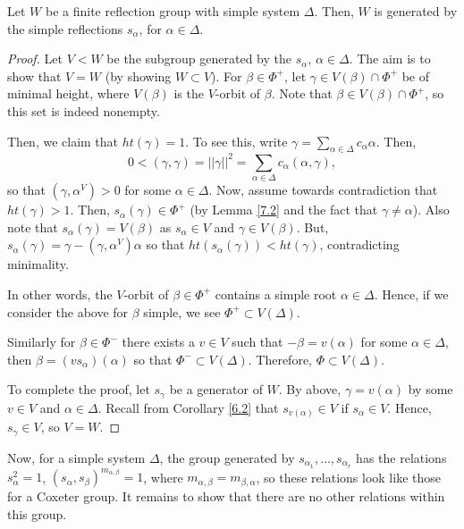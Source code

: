 \begin{theorem} \label{8.2}
Let $W$ be a finite reflection group with simple system $\Delta$. Then, $W$ is
generated by the simple reflections $s_\alpha$, for $\alpha \in \Delta$.
\end{theorem}

\begin{proof}
Let $V < W$ be the subgroup generated by the $s_\alpha$, $\alpha \in \Delta$.
The aim is to show that $V = W$ (by showing $W \subset V$).
For $\beta \in \Phi^+$, let $\gamma \in V(\beta) \cap \Phi^+$ be of minimal
height, where $V(\beta)$ is the $V$-orbit of $\beta$. Note that $\beta \in V(\beta)
\cap \Phi^+$, so this set is indeed nonempty.

Then, we claim that $ht(\gamma) = 1$. To see this, write
$\gamma = \sum_{\alpha \in \Delta} c_\alpha \alpha$. Then,
\[
    0 < (\gamma, \gamma) = ||\gamma||^2 = \sum_{\alpha \in \Delta}
    c_\alpha (\alpha, \gamma),
\]
so that $(\gamma, \alpha^V) > 0$ for some $\alpha \in \Delta$. Now, assume towards
contradiction that $ht(\gamma) > 1$. Then, $s_\alpha(\gamma) \in \Phi^+$
(by Lemma \ref{7.2} and the fact that $\gamma \neq \alpha$). Also note that
$s_\alpha(\gamma) = V(\beta)$ as $s_\alpha \in V$ and $\gamma \in V(\beta)$.
But, $s_\alpha(\gamma) = \gamma - (\gamma, \alpha^V) \alpha$ so that
$ht(s_\alpha(\gamma)) < ht(\gamma)$, contradicting minimality.

In other words, the $V$-orbit of $\beta \in \Phi^+$ contains a simple root
$\alpha \in \Delta$. Hence, if we consider the above for $\beta$ simple, we
see $\Phi^+ \subset V(\Delta)$.

Similarly for $\beta \in \Phi^-$ there exists a $v \in V$ such that $-\beta
= v(\alpha)$ for some $\alpha \in \Delta$, then $\beta = (v s_\alpha)(\alpha)$
so that $\Phi^- \subset V(\Delta)$.
Therefore, $\Phi \subset V(\Delta)$.

To complete the proof, let $s_\gamma$ be a generator of $W$. By above,
$\gamma = v(\alpha)$ by some $v \in V$ and $\alpha \in \Delta$. Recall from
Corollary \ref{6.2} that $s_{v(\alpha)} \in V$ if $s_\alpha \in V$. Hence,
$s_\gamma \in V$, so $V = W$.
\end{proof}

Now, for a simple system $\Delta$, the group generated by $s_{\alpha_1}, \dots,
s_{\alpha_r}$ has the relations $s_\alpha^2 = 1$, $(s_\alpha, s_\beta)^{m_{\alpha, \beta}}
= 1$, where $m_{\alpha, \beta} = m_{\beta, \alpha}$, so these relations look
like those for a Coxeter group. It remains to show that there are no other
relations within this group.
